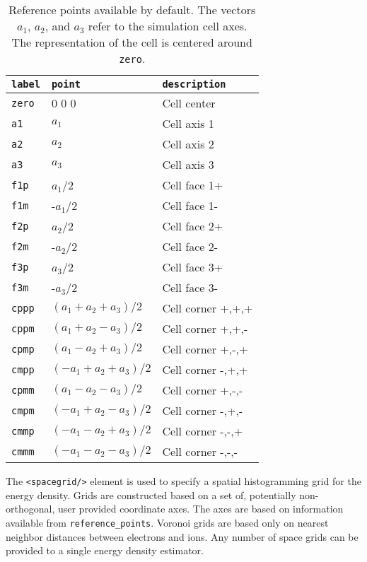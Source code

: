 \FloatBarrier
\begin{table}[h]
\begin{center}
\begin{tabular}{l l l}
\hline
\texttt{label} & \texttt{point} & \texttt{description} \\
\hline
\texttt{zero} & 0 0 0    & Cell center  \\
\texttt{a1}   &  $a_1$   & Cell axis 1  \\
\texttt{a2}   &  $a_2$   & Cell axis 2  \\
\texttt{a3}   &  $a_3$   & Cell axis 3  \\
\texttt{f1p}  &  $a_1$/2 & Cell face 1+ \\
\texttt{f1m}  & -$a_1$/2 & Cell face 1- \\
\texttt{f2p}  &  $a_2$/2 & Cell face 2+ \\
\texttt{f2m}  & -$a_2$/2 & Cell face 2- \\
\texttt{f3p}  &  $a_3$/2 & Cell face 3+ \\
\texttt{f3m}  & -$a_3$/2 & Cell face 3- \\
\texttt{cppp} & $(a_1+a_2+a_3)/2$  & Cell corner +,+,+ \\
\texttt{cppm} & $(a_1+a_2-a_3)/2$  & Cell corner +,+,- \\
\texttt{cpmp} & $(a_1-a_2+a_3)/2$  & Cell corner +,-,+ \\
\texttt{cmpp} & $(-a_1+a_2+a_3)/2$ & Cell corner -,+,+ \\
\texttt{cpmm} & $(a_1-a_2-a_3)/2$  & Cell corner +,-,- \\
\texttt{cmpm} & $(-a_1+a_2-a_3)/2$ & Cell corner -,+,- \\
\texttt{cmmp} & $(-a_1-a_2+a_3)/2$ & Cell corner -,-,+ \\
\texttt{cmmm} & $(-a_1-a_2-a_3)/2$ & Cell corner -,-,- \\
\hline
\end{tabular}
\end{center}
\caption{Reference points available by default.  The vectors $a_1$, $a_2$, and $a_3$ refer to the simulation cell axes.  The representation of the cell is centered around \texttt{zero}.}
\protect{\label{tab:ref_points}}
\end{table}
\FloatBarrier



The \texttt{<spacegrid/>} element is used to specify a spatial histogramming grid for the energy density.  Grids are constructed based on a set of, potentially non-orthogonal, user provided coordinate axes.  The axes are based on information available from \texttt{reference\_points}.  Voronoi grids are based only on nearest neighbor distances between electrons and ions.  Any number of space grids can be provided to a single energy density estimator.


